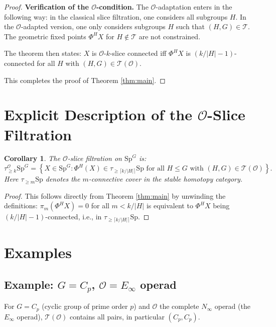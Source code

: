 \documentclass[12pt]{article}
\newtheorem{corollary}[theorem]{Corollary}
\begin{document}
\begin{proof}
\textbf{Verification of the $\mathcal{O}$-condition.} The $\mathcal{O}$-adaptation enters in the following way: in the classical slice filtration, one considers all subgroups $H$. In the $\mathcal{O}$-adapted version, one only considers subgroups $H$ such that $(H, G) \in \mathcal{T}$. The geometric fixed points $\Phi^H X$ for $H \notin \mathcal{T}$ are not constrained.

The theorem then states: $X$ is $\mathcal{O}$-$k$-slice connected iff $\Phi^H X$ is $(k/|H|-1)$-connected for all $H$ with $(H, G) \in \mathcal{T}(\mathcal{O})$.

This completes the proof of Theorem \ref{thm:main}.
\end{proof}

\section{Explicit Description of the $\mathcal{O}$-Slice Filtration}

\begin{corollary}\label{cor:filtration}
The $\mathcal{O}$-slice filtration on $\mathrm{Sp}^G$ is:
\[
\tau_{\geq k}^{\mathcal{O}} \mathrm{Sp}^G = \left\{X \in \mathrm{Sp}^G : \Phi^H(X) \in \tau_{\geq \lceil k/|H| \rceil} \mathrm{Sp} \text{ for all } H \leq G \text{ with } (H,G) \in \mathcal{T}(\mathcal{O})\right\}.
\]
Here $\tau_{\geq m} \mathrm{Sp}$ denotes the $m$-connective cover in the stable homotopy category.
\end{corollary}

\begin{proof}
This follows directly from Theorem \ref{thm:main} by unwinding the definitions: $\pi_m(\Phi^H X) = 0$ for all $m < k/|H|$ is equivalent to $\Phi^H X$ being $(k/|H|-1)$-connected, i.e., in $\tau_{\geq \lceil k/|H|\rceil} \mathrm{Sp}$.
\end{proof}

\section{Examples}

\subsection{Example: $G = C_p$, $\mathcal{O} = E_\infty$ operad}

For $G = C_p$ (cyclic group of prime order $p$) and $\mathcal{O}$ the complete $N_\infty$ operad (the $E_\infty$ operad), $\mathcal{T}(\mathcal{O})$ contains all pairs, in particular $(C_p, C_p)$.
\end{document}
